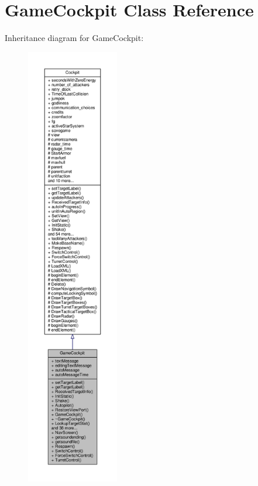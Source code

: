\hypertarget{classGameCockpit}{}\section{Game\+Cockpit Class Reference}
\label{classGameCockpit}


Inheritance diagram for Game\+Cockpit\+:
\nopagebreak
\begin{figure}[H]
\begin{center}
\leavevmode
\includegraphics[height=550pt]{d7/ddf/classGameCockpit__inherit__graph}
\end{center}
\end{figure}


